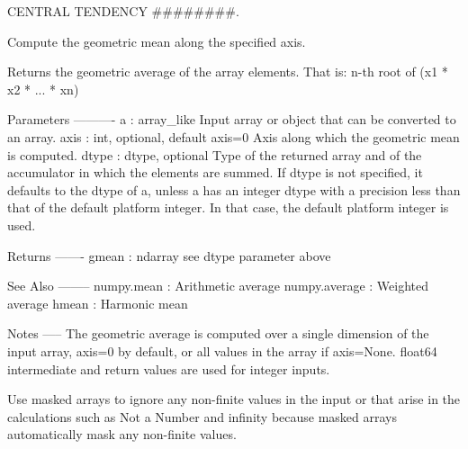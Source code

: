 C\+E\+N\+T\+R\+A\+L T\+E\+N\+D\+E\+N\+C\+Y \#\#\#\#\#\#\#\#. 

\begin{DoxyVerb}Compute the geometric mean along the specified axis.

Returns the geometric average of the array elements.
That is:  n-th root of (x1 * x2 * ... * xn)

Parameters
----------
a : array_like
    Input array or object that can be converted to an array.
axis : int, optional, default axis=0
    Axis along which the geometric mean is computed.
dtype : dtype, optional
    Type of the returned array and of the accumulator in which the
    elements are summed. If dtype is not specified, it defaults to the
    dtype of a, unless a has an integer dtype with a precision less than
    that of the default platform integer. In that case, the default
    platform integer is used.

Returns
-------
gmean : ndarray
    see dtype parameter above

See Also
--------
numpy.mean : Arithmetic average
numpy.average : Weighted average
hmean : Harmonic mean

Notes
-----
The geometric average is computed over a single dimension of the input
array, axis=0 by default, or all values in the array if axis=None.
float64 intermediate and return values are used for integer inputs.

Use masked arrays to ignore any non-finite values in the input or that
arise in the calculations such as Not a Number and infinity because masked
arrays automatically mask any non-finite values.\end{DoxyVerb}
 \hypertarget{namespacescipy_1_1stats_1_1stats_ad7bf370c4741b90596c8cecb021f2700}{}
